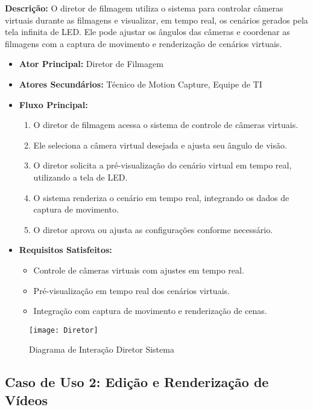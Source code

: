 \textbf{Descrição:} O diretor de filmagem utiliza o sistema para controlar câmeras virtuais durante as filmagens e visualizar, em tempo real, os cenários gerados pela tela infinita de LED. Ele pode ajustar os ângulos das câmeras e coordenar as filmagens com a captura de movimento e renderização de cenários virtuais.

\begin{itemize}
  \item \textbf{Ator Principal:} Diretor de Filmagem
  \item \textbf{Atores Secundários:} Técnico de Motion Capture, Equipe de TI
  \item \textbf{Fluxo Principal:}
    \begin{enumerate}
      \item O diretor de filmagem acessa o sistema de controle de câmeras virtuais.
      \item Ele seleciona a câmera virtual desejada e ajusta seu ângulo de visão.
      \item O diretor solicita a pré-visualização do cenário virtual em tempo real, utilizando a tela de LED.
      \item O sistema renderiza o cenário em tempo real, integrando os dados de captura de movimento.
      \item O diretor aprova ou ajusta as configurações conforme necessário.
    \end{enumerate}
  \item \textbf{Requisitos Satisfeitos:}
    \begin{itemize}
      \item Controle de câmeras virtuais com ajustes em tempo real.
      \item Pré-visualização em tempo real dos cenários virtuais.
      \item Integração com captura de movimento e renderização de cenas.
    \end{itemize}
\end{itemize}

\begin{figure}[ht]
    \centering
    \texttt{[image: Diretor]}
    \caption{Diagrama de Interação Diretor Sistema}
    \label{fig:diagram1}
\end{figure}

\subsection{Caso de Uso 2: Edição e Renderização de Vídeos}

